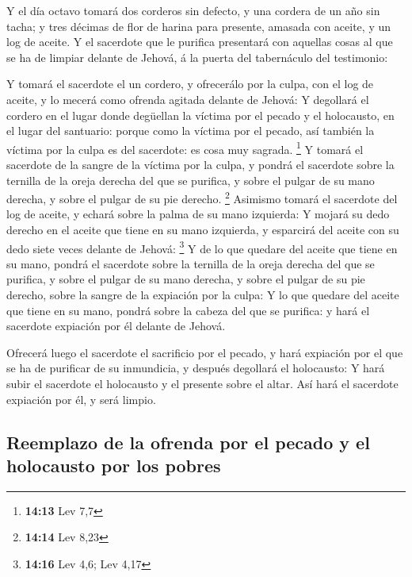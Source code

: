  Y el día octavo tomará dos corderos sin defecto, y una
cordera de un año sin tacha; y tres décimas de flor de harina para
presente, amasada con aceite, y un log de aceite.  Y el
sacerdote que le purifica presentará con aquellas cosas al que se ha de
limpiar delante de Jehová, á la puerta del tabernáculo del testimonio:

 Y tomará el sacerdote el un cordero, y ofrecerálo por la
culpa, con el log de aceite, y lo mecerá como ofrenda agitada delante de
Jehová:  Y degollará el cordero en el lugar donde degüellan
la víctima por el pecado y el holocausto, en el lugar del santuario:
porque como la víctima por el pecado, así también la víctima por la
culpa es del sacerdote: es cosa muy sagrada. \footnote{\textbf{14:13}
  Lev 7,7}  Y tomará el sacerdote de la sangre de la
víctima por la culpa, y pondrá el sacerdote sobre la ternilla de la
oreja derecha del que se purifica, y sobre el pulgar de su mano derecha,
y sobre el pulgar de su pie derecho. \footnote{\textbf{14:14} Lev 8,23}
 Asimismo tomará el sacerdote del log de aceite, y echará
sobre la palma de su mano izquierda:  Y mojará su dedo
derecho en el aceite que tiene en su mano izquierda, y esparcirá del
aceite con su dedo siete veces delante de Jehová: \footnote{\textbf{14:16}
  Lev 4,6; Lev 4,17}  Y de lo que quedare del aceite que
tiene en su mano, pondrá el sacerdote sobre la ternilla de la oreja
derecha del que se purifica, y sobre el pulgar de su mano derecha, y
sobre el pulgar de su pie derecho, sobre la sangre de la expiación por
la culpa:  Y lo que quedare del aceite que tiene en su
mano, pondrá sobre la cabeza del que se purifica: y hará el sacerdote
expiación por él delante de Jehová.

 Ofrecerá luego el sacerdote el sacrificio por el pecado, y
hará expiación por el que se ha de purificar de su inmundicia, y después
degollará el holocausto:  Y hará subir el sacerdote el
holocausto y el presente sobre el altar. Así hará el sacerdote expiación
por él, y será limpio.

\hypertarget{reemplazo-de-la-ofrenda-por-el-pecado-y-el-holocausto-por-los-pobres}{%
\subsection{Reemplazo de la ofrenda por el pecado y el holocausto por
los
pobres}\label{reemplazo-de-la-ofrenda-por-el-pecado-y-el-holocausto-por-los-pobres}}

